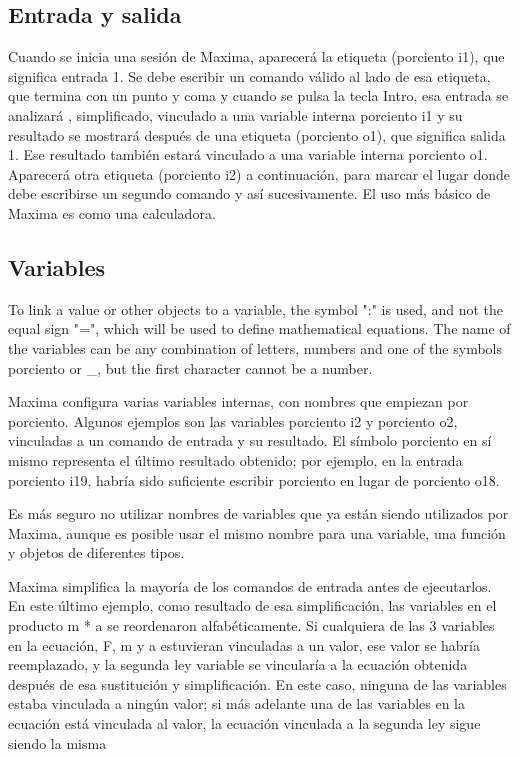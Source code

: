 \documentclass{article}
\begin{document}
\subsection{Entrada y salida}

Cuando se inicia una sesión de Maxima, aparecerá la etiqueta (porciento i1), que significa entrada 1. Se debe escribir un comando válido al lado de esa etiqueta, que termina con un punto y coma y cuando se pulsa la tecla Intro, esa entrada se analizará , simplificado, vinculado a una variable interna porciento i1 y su resultado se mostrará después de una etiqueta (porciento o1), que significa salida 1. Ese resultado también estará vinculado a una variable interna porciento o1. Aparecerá otra etiqueta (porciento i2) a continuación, para marcar el lugar donde debe escribirse un segundo comando y así sucesivamente. El uso más básico de Maxima es como una calculadora.


\subsection{Variables}

To link a value or other objects to a variable, the symbol ":" is used, and not the equal sign "=", which will be used to define mathematical equations. The name of the variables can be any combination of letters, numbers and one of the symbols porciento or _, but the first character cannot be a number.

Maxima configura varias variables internas, con nombres que empiezan por porciento. Algunos ejemplos son las variables porciento i2 y porciento o2, vinculadas a un comando de entrada y su resultado. El símbolo porciento en sí mismo representa el último resultado obtenido; por ejemplo, en la entrada porciento i19, habría sido suficiente escribir porciento en lugar de porciento o18.

Es más seguro no utilizar nombres de variables que ya están siendo utilizados por Maxima, aunque es posible usar el mismo nombre para una variable, una función y objetos de diferentes tipos.

Maxima simplifica la mayoría de los comandos de entrada antes de ejecutarlos. En este último ejemplo, como resultado de esa simplificación, las variables en el producto m * a se reordenaron alfabéticamente. Si cualquiera de las 3 variables en la ecuación, F, m y a estuvieran vinculadas a un valor, ese valor se habría reemplazado, y la segunda ley variable se vincularía a la ecuación obtenida después de esa sustitución y simplificación. En este caso, ninguna de las variables estaba vinculada a ningún valor; si más adelante una de las variables en la ecuación está vinculada al valor, la ecuación vinculada a la segunda ley sigue siendo la misma
\end{document}
